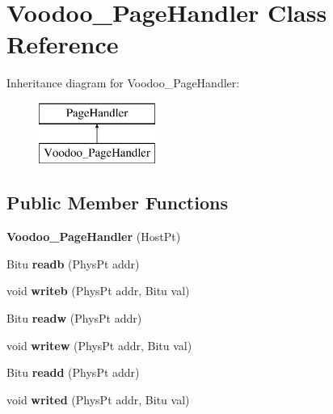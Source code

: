 \hypertarget{classVoodoo__PageHandler}{\section{Voodoo\-\_\-\-Page\-Handler Class Reference}
\label{classVoodoo__PageHandler}
}
Inheritance diagram for Voodoo\-\_\-\-Page\-Handler\-:\begin{figure}[H]
\begin{center}
\leavevmode
\includegraphics[height=2.000000cm]{classVoodoo__PageHandler}
\end{center}
\end{figure}
\subsection*{Public Member Functions}
\begin{DoxyCompactItemize}
\item 
\hypertarget{classVoodoo__PageHandler_a716fc1c10feb37ca8b1a5ae1646a195e}{{\bfseries Voodoo\-\_\-\-Page\-Handler} (Host\-Pt)}\label{classVoodoo__PageHandler_a716fc1c10feb37ca8b1a5ae1646a195e}

\item 
\hypertarget{classVoodoo__PageHandler_a8d67cb247f6c9fd4c2bc107d029feb6a}{Bitu {\bfseries readb} (Phys\-Pt addr)}\label{classVoodoo__PageHandler_a8d67cb247f6c9fd4c2bc107d029feb6a}

\item 
\hypertarget{classVoodoo__PageHandler_a23a27d5a0f37f80c7cbb826f0593a2ee}{void {\bfseries writeb} (Phys\-Pt addr, Bitu val)}\label{classVoodoo__PageHandler_a23a27d5a0f37f80c7cbb826f0593a2ee}

\item 
\hypertarget{classVoodoo__PageHandler_ac6523ad27f087eba8929688924e4e7ae}{Bitu {\bfseries readw} (Phys\-Pt addr)}\label{classVoodoo__PageHandler_ac6523ad27f087eba8929688924e4e7ae}

\item 
\hypertarget{classVoodoo__PageHandler_a6d910dbbd6925a5755c27ed47f8e1866}{void {\bfseries writew} (Phys\-Pt addr, Bitu val)}\label{classVoodoo__PageHandler_a6d910dbbd6925a5755c27ed47f8e1866}

\item 
\hypertarget{classVoodoo__PageHandler_a12b54aea2bbe150bebe71ef135ab6fec}{Bitu {\bfseries readd} (Phys\-Pt addr)}\label{classVoodoo__PageHandler_a12b54aea2bbe150bebe71ef135ab6fec}

\item 
\hypertarget{classVoodoo__PageHandler_a6d5e274b25c96268d2fde89c33d5ac13}{void {\bfseries writed} (Phys\-Pt addr, Bitu val)}\label{classVoodoo__PageHandler_a6d5e274b25c96268d2fde89c33d5ac13}

\end{DoxyCompactItemize}


